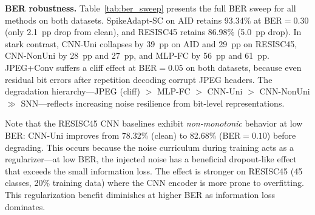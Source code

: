 \documentclass[conference]{IEEEtran}
\begin{document}
\textbf{BER robustness.} Table~\ref{tab:ber_sweep} presents the full BER sweep for all methods on both datasets. SpikeAdapt-SC on AID retains 93.34\% at BER${=}0.30$ (only 2.1~pp drop from clean), and RESISC45 retains 86.98\% (5.0~pp drop). In stark contrast, CNN-Uni collapses by 39~pp on AID and 29~pp on RESISC45, CNN-NonUni by 28~pp and 27~pp, and MLP-FC by 56~pp and 61~pp. JPEG+Conv suffers a cliff effect at BER${=}0.05$ on both datasets, because even residual bit errors after repetition decoding corrupt JPEG headers. The degradation hierarchy---JPEG (cliff) $>$ MLP-FC $>$ CNN-Uni $>$ CNN-NonUni $\gg$ SNN---reflects increasing noise resilience from bit-level representations.

Note that the RESISC45 CNN baselines exhibit \emph{non-monotonic} behavior at low BER: CNN-Uni improves from 78.32\% (clean) to 82.68\% (BER${=}0.10$) before degrading. This occurs because the noise curriculum during training acts as a regularizer---at low BER, the injected noise has a beneficial dropout-like effect that exceeds the small information loss. The effect is stronger on RESISC45 (45 classes, 20\% training data) where the CNN encoder is more prone to overfitting. This regularization benefit diminishes at higher BER as information loss dominates.
\end{document}
